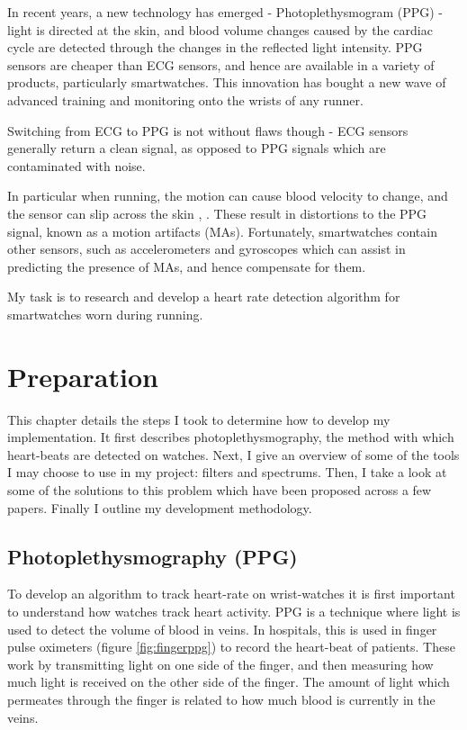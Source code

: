 \documentclass[12pt,a4paper,twoside,openright]{report}
\begin{document}
In recent years, a new technology has emerged - Photoplethysmogram (PPG) 
- light is directed at the skin, and blood volume changes caused by the
cardiac cycle are detected through the changes in the reflected light
intensity. PPG sensors are cheaper than ECG sensors, and hence are 
available in a variety of products, particularly smartwatches. This 
innovation has bought a new wave of advanced training and monitoring onto
the wrists of any runner.

Switching from ECG to PPG is not without flaws though - ECG sensors generally return a
clean signal, as opposed to PPG signals which are contaminated with
noise.

In particular when running, the motion can cause blood velocity to 
change, and the sensor can slip across the skin \cite{Wijshoff17}, 
\cite{Wood06}. These result in distortions to the PPG signal, known as a
motion artifacts (MAs). Fortunately, smartwatches contain other sensors, such
as accelerometers and gyroscopes which can assist in predicting the presence of 
MAs, and hence compensate for them.

My task is to research and develop a heart rate detection algorithm
for smartwatches worn during running. 

\chapter{Preparation}

This chapter details the steps I took to determine how to develop my
implementation. It first describes photoplethysmography, the method with which heart-beats are
detected on watches. Next,
I give an overview of some of the tools I may choose to use in my project:
filters and spectrums. Then, I take a look at some of the solutions to this
problem which have been proposed across a few papers. Finally I outline my
development methodology. 

\section{Photoplethysmography (PPG)}

To develop an algorithm to track heart-rate on wrist-watches it is first important to
understand how watches track heart activity. PPG is a technique where light is
used to detect the volume of blood in veins. In hospitals, this is used in
finger pulse oximeters (figure \ref{fig:fingerppg}) to record the heart-beat
of patients. These work by transmitting light on one side of the finger, and
then measuring how much light is received on the other side of the finger.
The amount of light which permeates through the finger is related to how much
blood is currently in the veins.
\end{document}
